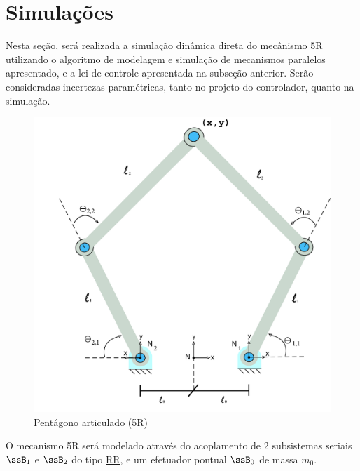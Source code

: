 \documentclass[]{politex}
\begin{document}
\section{Simulações}

Nesta seção, será realizada a simulação dinâmica direta do mecânismo 5R utilizando o algoritmo de modelagem e simulação de mecanismos paralelos apresentado, e a lei de controle apresentada na subseção anterior. Serão consideradas incertezas paramétricas, tanto no projeto do controlador, quanto na simulação.

\begin{figure}[h]
	\centering
	\includegraphics[scale=0.10]{../figures/5Rscan.jpg}  
	\caption{Pentágono articulado (5R)}
	\label{fig:5R}
\end{figure}

O mecanismo 5R será modelado através do acoplamento de 2 subsistemas seriais $\ssB_1$ e $\ssB_2$ do tipo \underline{R}\underline{R}, e um efetuador pontual $\ssB_0$ de massa $m_0$.
\end{document}
